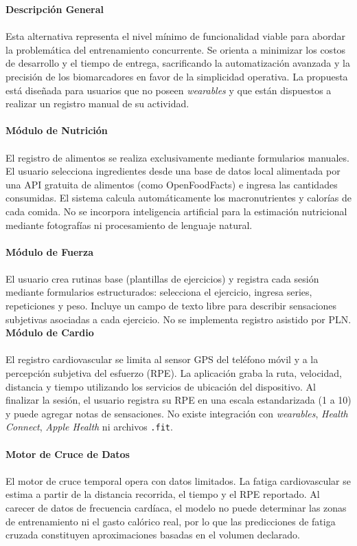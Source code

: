 \documentclass[12pt]{article}
\begin{document}
\textbf{Descripción General}
\\\\
Esta alternativa representa el nivel mínimo de funcionalidad viable para abordar la problemática del entrenamiento concurrente. Se orienta a minimizar los costos de desarrollo y el tiempo de entrega, sacrificando la automatización avanzada y la precisión de los biomarcadores en favor de la simplicidad operativa. La propuesta está diseñada para usuarios que no poseen \textit{wearables} y que están dispuestos a realizar un registro manual de su actividad.
\\\\
\textbf{Módulo de Nutrición}
\\\\
El registro de alimentos se realiza exclusivamente mediante formularios manuales. El usuario selecciona ingredientes desde una base de datos local alimentada por una API gratuita de alimentos (como OpenFoodFacts) e ingresa las cantidades consumidas. El sistema calcula automáticamente los macronutrientes y calorías de cada comida. No se incorpora inteligencia artificial para la estimación nutricional mediante fotografías ni procesamiento de lenguaje natural.
\\\\
\textbf{Módulo de Fuerza}
\\\\
El usuario crea rutinas base (plantillas de ejercicios) y registra cada sesión mediante formularios estructurados: selecciona el ejercicio, ingresa series, repeticiones y peso. Incluye un campo de texto libre para describir sensaciones subjetivas asociadas a cada ejercicio. No se implementa registro asistido por PLN.
\newpage
\textbf{Módulo de Cardio}
\\\\
El registro cardiovascular se limita al sensor GPS del teléfono móvil y a la percepción subjetiva del esfuerzo (RPE). La aplicación graba la ruta, velocidad, distancia y tiempo utilizando los servicios de ubicación del dispositivo. Al finalizar la sesión, el usuario registra su RPE en una escala estandarizada (1 a 10) y puede agregar notas de sensaciones. No existe integración con \textit{wearables}, \textit{Health Connect}, \textit{Apple Health} ni archivos \texttt{.fit}.
\\\\
\textbf{Motor de Cruce de Datos}
\\\\
El motor de cruce temporal opera con datos limitados. La fatiga cardiovascular se estima a partir de la distancia recorrida, el tiempo y el RPE reportado. Al carecer de datos de frecuencia cardíaca, el modelo no puede determinar las zonas de entrenamiento ni el gasto calórico real, por lo que las predicciones de fatiga cruzada constituyen aproximaciones basadas en el volumen declarado.
\end{document}
